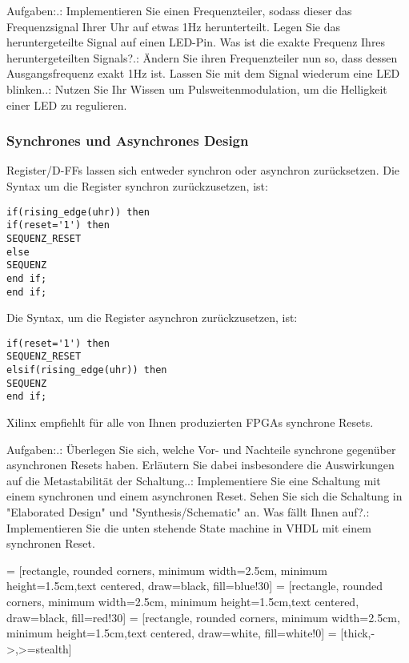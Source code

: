 \documentclass{article}
\begin{document}
Aufgaben:.: Implementieren Sie einen Frequenzteiler, sodass dieser das Frequenzsignal Ihrer Uhr auf etwas 1Hz herunterteilt. Legen Sie das heruntergeteilte Signal auf einen LED-Pin. Was ist die exakte Frequenz Ihres heruntergeteilten Signals?.: \"Andern Sie ihren Frequenzteiler nun so, dass dessen Ausgangsfrequenz exakt 1Hz ist. Lassen Sie mit dem Signal wiederum eine LED blinken..: Nutzen Sie Ihr Wissen um Pulsweitenmodulation, um die Helligkeit einer LED zu regulieren.\newline

\subsubsection{Synchrones und Asynchrones Design}
Register/D-FFs  lassen sich entweder synchron oder asynchron zur\"ucksetzen. Die Syntax um die Register synchron zur\"uckzusetzen, ist:\newline
\begin{verbatim}
if(rising_edge(uhr)) then
if(reset='1') then
SEQUENZ_RESET
else
SEQUENZ
end if;
end if;
\end{verbatim}
Die Syntax, um die Register asynchron zur\"uckzusetzen, ist:\newline
\begin{verbatim}
if(reset='1') then
SEQUENZ_RESET
elsif(rising_edge(uhr)) then
SEQUENZ
end if;
\end{verbatim}
Xilinx empfiehlt f\"ur alle von Ihnen produzierten FPGAs synchrone Resets.\citep{Xilinxsync} \newline


Aufgaben:.: \"Uberlegen Sie sich, welche Vor- und Nachteile synchrone gegen\"uber asynchronen Resets haben. Erl\"autern Sie dabei insbesondere die Auswirkungen auf die Metastabilit\"at der Schaltung..: Implementiere Sie eine Schaltung mit einem synchronen und einem asynchronen Reset. Sehen Sie sich die Schaltung in "Elaborated Design" und "Synthesis/Schematic" an. Was f\"allt Ihnen auf?.: Implementieren Sie die unten stehende State machine in VHDL mit einem synchronen Reset.\newline

 = [rectangle, rounded corners, minimum width=2.5cm, minimum height=1.5cm,text centered, draw=black, fill=blue!30]
 = [rectangle, rounded corners, minimum width=2.5cm, minimum height=1.5cm,text centered, draw=black, fill=red!30]
 = [rectangle, rounded corners, minimum width=2.5cm, minimum height=1.5cm,text centered, draw=white, fill=white!0]
 = [thick,->,>=stealth]
\end{document}
